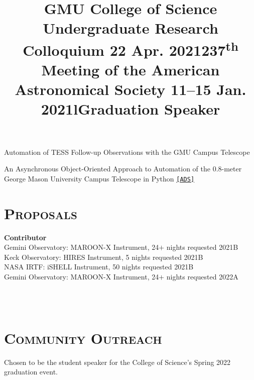 \documentclass[marg, centered]{res}
\begin{document}
\begin{resume}
\vspace{-0.3cm}
\title{\textbf{GMU College of Science Undergraduate Research Colloquium} \hfill \textbf{22 Apr. 2021}}
\begin{position}
Automation of TESS Follow-up Observations with the GMU Campus Telescope
\end{position}

\vspace{-0.3cm}
\title{\textbf{237\textsuperscript{th} Meeting of the American Astronomical Society} \hfill \textbf{11--15 Jan. 2021}}
\begin{position}
An Asynchronous Object-Oriented Approach to Automation of the 0.8-meter\\ George Mason University Campus Telescope in Python \href{https://ui.adsabs.harvard.edu/abs/2021AAS...23734407R/abstract}{\texttt{[ADS]}}
\end{position}


\section{{\scshape \bfseries Proposals}}
\textbf{Contributor} \\
Gemini Observatory: MAROON-X Instrument, 24$+$ nights requested \hfill 2021B \\
Keck Observatory: HIRES Instrument, 5 nights requested \hfill 2021B \\
NASA IRTF: iSHELL Instrument, 50 nights requested \hfill 2021B \\
Gemini Observatory: MAROON-X Instrument, 24$+$ nights requested \hfill 2022A \\

\begin{format}
\title{l} \\
 \\
\body
\end{format}

\section{{\scshape \bfseries Community Outreach}}

\title{\textbf{Graduation Speaker}}
\begin{position}
Chosen to be the student speaker for the College of Science's Spring 2022 graduation event.
\end{position}


\end{resume}
\end{document}
